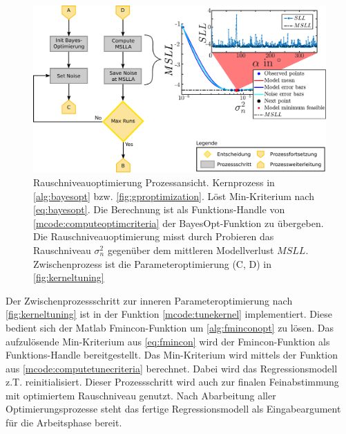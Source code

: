 \vspace{5mm}
\begin{figure}[bph]
	\centering
	\includegraphics[width=\linewidth]{chapters/images/3-SW-E-OExp/Noise_Optimization}
	\caption[Rauschniveauoptimierung Prozessansicht]{Rauschniveauoptimierung Prozessansicht. Kernprozess in \autoref{alg:bayesopt} bzw. \autoref{fig:gproptimization}. Löst Min-Kriterium nach \autoref{eq:bayesopt}. Die Berechnung ist als Funktions-Handle von \autoref{mcode:computeoptimcriteria} der BayesOpt-Funktion zu übergeben. Die Rauschniveauoptimierung misst durch Probieren das Rauschniveau $\sigma_n^2$ gegenüber dem mittleren Modellverlust $MSLL$. Zwischenprozess ist die Parameteroptimierung (C, D) in \autoref{fig:kerneltuning}}
	\label{fig:noiseoptimization}
\end{figure}


\clearpage


Der Zwischenprozessschritt zur inneren Parameteroptimierung nach \autoref{fig:kerneltuning} ist in der Funktion \autoref{mcode:tunekernel} implementiert. Diese bedient sich der Matlab Fmincon-Funktion um \autoref{alg:fminconopt} zu lösen. Das aufzulösende Min-Kriterium aus \autoref{eq:fmincon} wird der Fmincon-Funktion als Funktions-Handle bereitgestellt. Das Min-Kriterium wird mittels der Funktion aus \autoref{mcode:computetunecriteria} berechnet. Dabei wird das Regressionsmodell z.T. reinitialisiert. Dieser Prozessschritt wird auch zur finalen Feinabstimmung mit optimiertem Rauschniveau genutzt. Nach Abarbeitung aller Optimierungsprozesse steht das fertige Regressionsmodell als Eingabeargument für die Arbeitsphase bereit.


